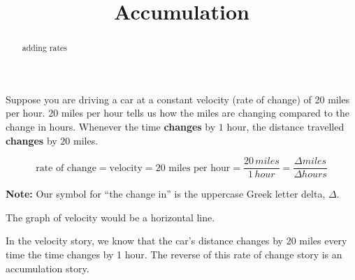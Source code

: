 \documentclass{ximera}
\title{Accumulation}
\begin{document}
\begin{abstract}
adding rates
\end{abstract}
\maketitle





Suppose you are driving a car at a constant velocity (rate of change) of 20 miles per hour. 20 miles per hour tells us how the miles are changing compared to the change in hours.  Whenever the time \textbf{\textcolor{purple!85!blue}{changes}} by $1$ hour, the distance travelled \textbf{\textcolor{purple!85!blue}{changes}} by $20$ miles.

\[
\text{rate of change} = \text{velocity} = \text{20 miles per hour} = \frac{20 \, miles}{1 \, hour} = \frac{\Delta miles}{\Delta hours}
\]

\textbf{Note:} Our symbol for ``the change in'' is the uppercase Greek letter delta, $\Delta$. 

The graph of velocity would be a horizontal line.



\begin{image}
\end{image}

In the velocity story, we know that the car's distance changes by 20 miles every time the time changes by 1 hour.  The reverse of this rate of change story is an accumulation story.
\end{document}
